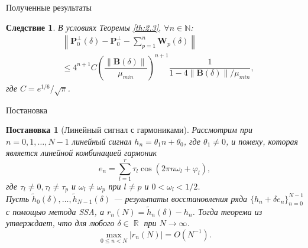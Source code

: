 \documentclass[notheorems, handout]{beamer}
\newtheorem{corollary}{Следствие}
\newtheorem{statement}{Постановка}
\DeclareMathOperator{\R}{\mathbb{R}}
\newcommand{\norm}[1]{\left\|#1\right\|}
\begin{document}
	\begin{frame}{Полученные результаты}
		\begin{corollary}
			В условиях Теоремы \ref{th:2.3}, $\forall n\in\mathbb{N}$:
			\begin{align*}
				&\norm{\mathbf{P}_0^\bot(\delta) - \mathbf{P}_0^\bot - \sum\limits^n_{p=1}\mathbf{W}_p(\delta)}\nonumber
				\\
				&\leqslant 4^{n+1}C\left(\dfrac{\norm{\mathbf{B}(\delta)}}{\mu_{min}}\right)^{n+1}\dfrac{1}{1-4\norm{\mathbf{B}(\delta)}/\mu_{min}},
			\end{align*}
			где $C = e^{1/6}/\sqrt{\pi}$.
		\end{corollary}
	\end{frame}
	\begin{frame}{Постановка}
		\begin{statement}[Линейный сигнал с гармониками]
			Рассмотрим при $n=0,1,\dots,N-1$ линейный сигнал $h_n = \theta_1n+\theta_0$, где $\theta_1 \neq 0$, и помеху, которая является линейной комбинацией гармоник
			\begin{equation*}
				e_n = \sum^r_{l=1}\tau_l\cos(2\pi n\omega_l + \varphi_l),
			\end{equation*} 
			где $\tau_l\neq0,\tau_l\neq\tau_p$ и $\omega_l \neq \omega_p$ при $l\neq p$ и $0 < \omega_l < 1/2$.
			\\
			Пусть $\widetilde{h}_0(\delta),\dots,\widetilde{h}_{N-1}(\delta)$ --- результаты восстановления ряда $\{h_n+\delta e_n\}_{n=0}^{N-1}$ с помощью метода SSA, а $r_n(N) = \widetilde{h}_n(\delta) - h_n$. Тогда теорема из \cite{ZNekrutkin} утверждает, что для любого $\delta\in\R$ при $N\rightarrow\infty$. 
			\begin{equation*}
				\max_{0\leqslant n<N}|r_n(N)|=O(N^{-1}).
			\end{equation*}
		\end{statement}
	\end{frame}
\end{document}

